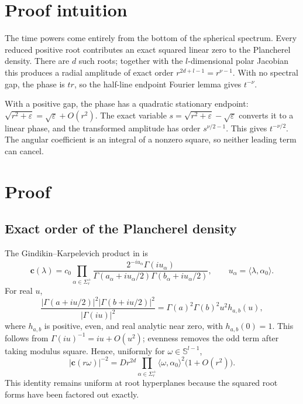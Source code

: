 \documentclass[11pt]{article}
\newcommand{\Sphere}{\mathbb S}
\newcommand{\cHC}{\mathbf c}
\begin{document}
\section{Proof intuition}

The time powers come entirely from the bottom of the spherical spectrum.
Every reduced positive root contributes an exact squared linear zero to the
Plancherel density.  There are $d$ such roots; together with the
$l$-dimensional polar Jacobian this produces a radial amplitude of exact
order $r^{2d+l-1}=r^{\nu-1}$.  With no spectral gap, the phase is $tr$, so
the half-line endpoint Fourier lemma gives $t^{-\nu}$.

With a positive gap, the phase has a quadratic stationary endpoint:
$\sqrt{r^2+\varepsilon}=\sqrt\varepsilon+O(r^2)$.  The exact variable
$s=\sqrt{r^2+\varepsilon}-\sqrt\varepsilon$ converts it to a linear phase,
and the transformed amplitude has order $s^{\nu/2-1}$.  This gives
$t^{-\nu/2}$.  The angular coefficient is an integral of a nonzero square,
so neither leading term can cancel.

\section{Proof}

\subsection{Exact order of the Plancherel density}

The Gindikin--Karpelevich product in \cite[Eq.~(2.6)]{KS} is
\[
 \cHC(\lambda)=c_0\prod_{\alpha\in\Sigma_r^+}
 \frac{2^{-iu_\alpha}\Gamma(iu_\alpha)}
 {\Gamma(a_\alpha+iu_\alpha/2)
  \Gamma(b_\alpha+iu_\alpha/2)},
 \qquad u_\alpha=\langle\lambda,\alpha_0\rangle.
\]
For real $u$,
\[
 \frac{|\Gamma(a+iu/2)|^2|\Gamma(b+iu/2)|^2}
      {|\Gamma(iu)|^2}
 =\Gamma(a)^2\Gamma(b)^2u^2h_{a,b}(u),
\]
where $h_{a,b}$ is positive, even, and real analytic near zero, with
$h_{a,b}(0)=1$.  This follows from $\Gamma(iu)^{-1}=iu+O(u^2)$; evenness
removes the odd term after taking modulus square.  Hence, uniformly for
$\omega\in\Sphere^{l-1}$,
\begin{equation}\label{eq:c-leading}
 |\cHC(r\omega)|^{-2}
 =Dr^{2d}\prod_{\alpha\in\Sigma_r^+}
 \langle\omega,\alpha_0\rangle^2\bigl(1+O(r^2)\bigr).
\end{equation}
This identity remains uniform at root hyperplanes because the squared root
forms have been factored out exactly.
\end{document}
